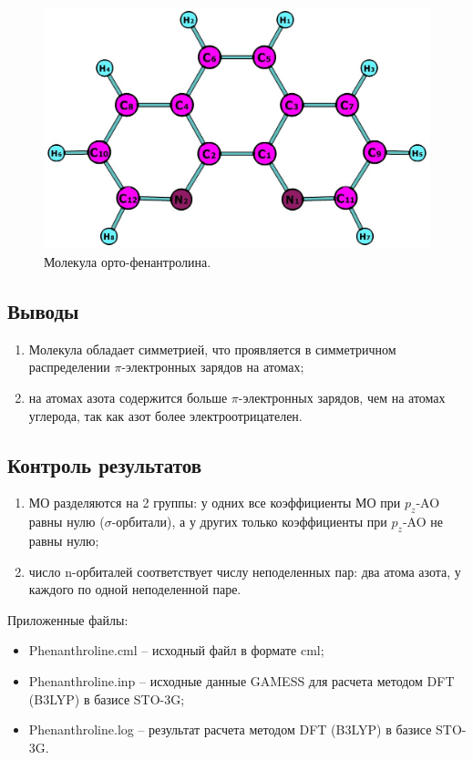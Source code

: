 \begin{figure}[H]
\centering
\captionsetup{justification=centering}
\includegraphics[scale=0.4]{fig/1.jpg}
\caption{Молекула орто-фенантролина.}
\label{img:img4}
\end{figure}


\subsection{Выводы}
\begin{enumerate}
    \item Молекула обладает симметрией, что проявляется в симметричном распределении $\pi$-электронных зарядов на атомах;
    \item на атомах азота содержится больше $\pi$-электронных зарядов, чем на атомах углерода, так как азот более электроотрицателен.
\end{enumerate}{}

\subsection{Контроль результатов}
\begin{enumerate}
    \item МО разделяются на 2 группы: у одних все коэффициенты МО при $p_z$-AO равны нулю ($\sigma$-орбитали), а у других только коэффициенты при $p_z$-AO не равны нулю;
    \item число n-орбиталей соответствует числу неподеленных пар: два атома азота, у каждого по одной неподеленной паре.
\end{enumerate}

Приложенные файлы:
\begin{itemize}
    \item Phenanthroline.cml – исходный файл в формате cml;
    \item Phenanthroline.inp – исходные данные GAMESS для расчета методом DFT (B3LYP) в базисе STO-3G;
    \item Phenanthroline.log – результат расчета методом DFT (B3LYP)  в базисе STO-3G.
\end{itemize}{}